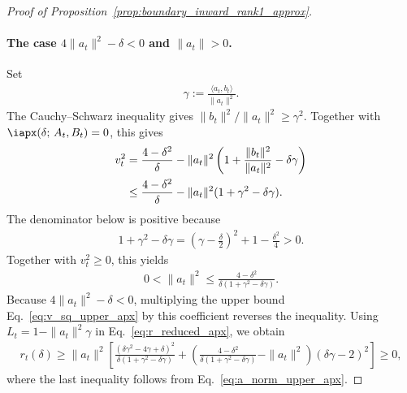 \documentclass{article}
\begin{document}
\begin{proof}[Proof of Proposition~\ref{prop:boundary_inward_rank1_approx}]
\paragraph{The case $4\|a_t\|^2-\delta<0$ and $\|a_t\|>0$.}
Set
\begin{align}
    \gamma:=\frac{\langle a_t,b_t\rangle}{\|a_t\|^2}.
\end{align}
The Cauchy--Schwarz inequality gives
$\|b_t\|^2/\|a_t\|^2\ge\gamma^2$. Together with
$\iapx(\delta;\,A_t,B_t)=0$, this gives
\begin{align}
    v_t^2
    &=\frac{4-\delta^2}{\delta}
      -\|a_t\|^2
       \left(1+\frac{\|b_t\|^2}{\|a_t\|^2}-\delta\gamma\right)
      \notag\\
    &\le \frac{4-\delta^2}{\delta}
       -\|a_t\|^2(1+\gamma^2-\delta\gamma).
    \label{eq:v_sq_upper_apx}
\end{align}
The denominator below is positive because
\begin{align}
    1+\gamma^2-\delta\gamma
    =\left(\gamma-\frac{\delta}{2}\right)^2
     +1-\frac{\delta^2}{4}
    >0.
\end{align}
Together with $v_t^2\ge0$, this yields
\begin{align}
    0<\|a_t\|^2\le
    \frac{4-\delta^2}
         {\delta(1+\gamma^2-\delta\gamma)}.
    \label{eq:a_norm_upper_apx}
\end{align}
Because $4\|a_t\|^2-\delta<0$, multiplying the upper bound
Eq.~\eqref{eq:v_sq_upper_apx} by this coefficient reverses the inequality.
Using $L_t=1-\|a_t\|^2\gamma$ in Eq.~\eqref{eq:r_reduced_apx}, we obtain
\begin{align}
    r_t(\delta)
    \ge \|a_t\|^2\left[
        \frac{(\delta\gamma^2-4\gamma+\delta)^2}
             {\delta(1+\gamma^2-\delta\gamma)}
        +\left(
            \frac{4-\delta^2}
                 {\delta(1+\gamma^2-\delta\gamma)}-\|a_t\|^2
         \right)(\delta\gamma-2)^2
      \right]
    \ge0,
    \label{eq:r_apx_square_bound}
\end{align}
where the last inequality follows from
Eq.~\eqref{eq:a_norm_upper_apx}.


\end{proof}
\end{document}
